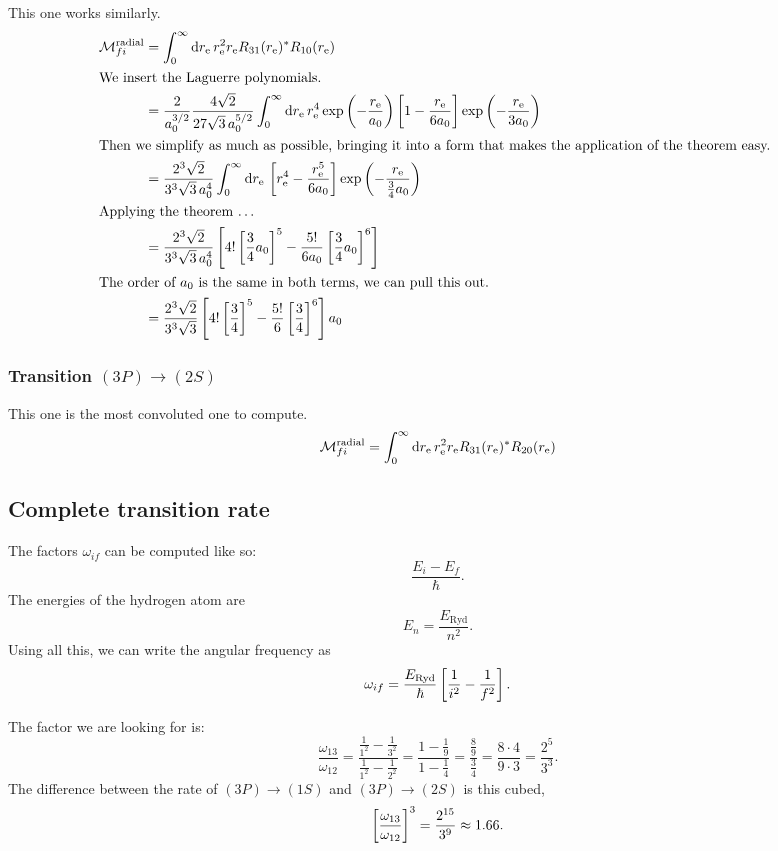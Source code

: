 \documentclass[11pt, english, fleqn, DIV=15, headinclude, BCOR=1.5cm]{scrartcl}
\newcommand\ra{^\text{radial}}
\begin{document}
This one works similarly.
\begin{align*}
    \mathcal M_{fi}\ra
    &= \int_0^\infty \dif \re \, \re^2 \re R_{31}(\re)^* R_{10}(\re) \\
    \intertext{%
        We insert the Laguerre polynomials.
    }
    &= \frac{2}{a_0^{3/2}} \frac{4 \sqrt 2}{27 \sqrt 3 \, a_0^{5/2}}
    \int_0^\infty \dif \re
    \, \re^4 \exp\del{-\frac{\re}{a_0}} \sbr{1 - \frac\re{6a_0}} \exp\del{-\frac{\re}{3a_0}} \\
    \intertext{%
        Then we simplify as much as possible, bringing it into a form that
        makes the application of the theorem easy.
    }
    &= \frac{2^3 \sqrt 2}{3^3 \sqrt 3 \, a_0^4} 
    \int_0^\infty \dif \re
    \, \sbr{\re^4 - \frac{\re^5}{6a_0}} \exp\del{-\frac{\re}{\frac34 a_0}} \\
    \intertext{%
        Applying the theorem …
    }
    &= \frac{2^3 \sqrt 2}{3^3 \sqrt 3 \, a_0^4} 
    \sbr{4! \sbr{\frac34 a_0}^5 - \frac{5!}{6 a_0} \sbr{\frac34 a_0}^6} \\
    \intertext{%
        The order of $a_0$ is the same in both terms, we can pull this out.
    }
    &= \frac{2^3 \sqrt 2}{3^3 \sqrt 3} 
    \sbr{4! \sbr{\frac34}^5 - \frac{5!}{6} \sbr{\frac34}^6} a_0
\end{align*}



\subsubsection{Transition $(3P) \to (2S)$}

This one is the most convoluted one to compute.
\begin{align*}
    \mathcal M_{fi}\ra
    &= \int_0^\infty \dif \re \, \re^2 \re R_{31}(\re)^* R_{20}(\re) \\
\end{align*}


\subsection{Complete transition rate}

The factors $\omega_{if}$ can be computed like so:
\[
    \frac{E_i - E_f}\hbar.
\]
The energies of the hydrogen atom are
\[
    E_n = \frac{E_\text{Ryd}}{n^2}.
\]
Using all this, we can write the angular frequency as
\[
    \omega_{if} = \frac{E_\text{Ryd}}\hbar \left[ \frac{1}{i^2} - \frac{1}{f^2} \right].
\]

The factor we are looking for is:
\[
    \frac{\omega_{13}}{\omega_{12}}
    = \frac{\frac{1}{1^2} - \frac{1}{3^2}}{\frac{1}{1^2} - \frac{1}{2^2}}
    = \frac{1 - \frac{1}{9}}{1 - \frac{1}{4}}
    = \frac{\frac{8}{9}}{\frac{3}{4}}
    = \frac{8 \cdot 4}{9 \cdot 3}
    = \frac{2^5}{3^3}.
\]
The difference between the rate of $(3P) \to (1S)$ and $(3P) \to (2S)$ is this
cubed,
\[
    \left[ \frac{\omega_{13}}{\omega_{12}} \right]^3
    = \frac{2^{15}}{3^9} \approx \num{1.66}.
\]
\end{document}
